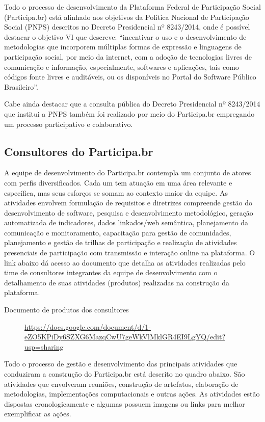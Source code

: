 \documentclass{article}
\begin{document}
Todo o processo de desenvolvimento da Plataforma Federal de Participação Social
(Participa.br) está alinhado aos objetivos da Política Nacional de Participação
Social (PNPS) descritos no Decreto Presidencial nº 8243/2014, onde é possível
destacar o objetivo VI que descreve: ``incentivar o uso e o desenvolvimento de
metodologias que incorporem múltiplas formas de expressão e linguagens de
participação social, por meio da internet, com a adoção de tecnologias livres
de comunicação e informação, especialmente, softwares e aplicações, tais como
códigos fonte livres e auditáveis, ou os disponíveis no Portal do Software
Público Brasileiro''.

Cabe ainda destacar que a consulta pública do Decreto Presidencial nº 8243/2014
que institui a PNPS também foi realizado por meio do Participa.br empregando um
processo participativo e colaborativo.

\subsection{Consultores do Participa.br}

A equipe de desenvolvimento do Participa.br contempla um conjunto de atores com
perfis diversificados. Cada um tem atuação em uma área relevante e específica,
mas seus esforços se somam ao contexto maior da equipe. As atividades envolvem
formulação de requisitos e diretrizes compreende gestão do desenvolvimento de
software, pesquisa e desenvolvimento metodológico, geração automatizada de
indicadores, dados linkados/web semântica, planejamento da comunicação e
monitoramento, capacitação para gestão de comunidades, planejamento e gestão de
trilhas de participação e realização de atividades presenciais de participação
com transmissão e interação online na plataforma. O link abaixo dá acesso ao
documento que detalha as atividades realizadas pelo time de consultores
integrantes da equipe de desenvolvimento  com o detalhamento de suas atividades
(produtos) realizadas na construção da plataforma.

\begin{description}
  \item [Documento de produtos dos consultores]
  \url{https://docs.google.com/document/d/1-eZO5KPiDy6SZXG6MazqCwU7geWkVlMklGR4EI9LgYQ/edit?usp=sharing}
\end{description}

Todo o processo de gestão e desenvolvimento das principais atividades que
conduziram a construção do Participa.br está descrito no quadro abaixo. São
atividades que envolveram reuniões, construção de artefatos, elaboração de
metodologias, implementações computacionais e outras ações. As atividades estão
dispostas cronologicamente e algumas possuem imagens ou links para melhor
exemplificar as ações.
\end{document}
